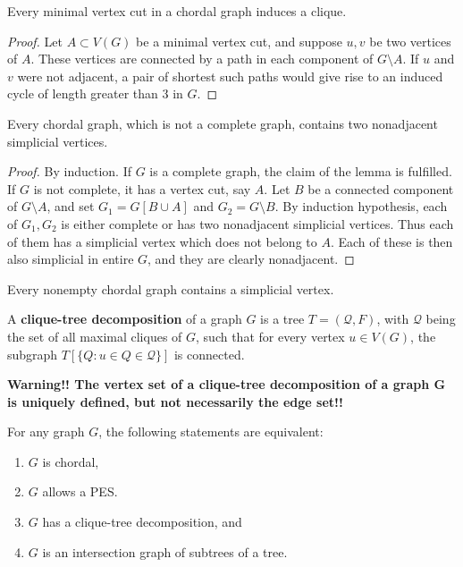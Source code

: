 \begin{lemma}
	Every minimal vertex cut in a chordal graph induces a clique.
\end{lemma}

\begin{proof}
	Let $A \subset V(G)$ be a minimal vertex cut, and suppose $u, v$ be two vertices of $A$. These vertices	are connected by a path in each component of $G \setminus A$. If $u$ and $v$ were not adjacent, a pair of shortest such paths would give rise to an induced cycle of length greater than 3 in $G$.
\end{proof}

\begin{lemma}
	Every chordal graph, which is not a complete graph, contains two nonadjacent simplicial vertices.
	\label{lemma-r2}
\end{lemma}

\begin{proof}
	By induction. If $G$ is a complete graph, the claim of the lemma is fulfilled. If $G$ is not complete, it has a vertex cut, say $A$. Let $B$ be a connected component of $G \setminus A$, and set $G_1 = G[B \cup A]$ and $G_2 = G \setminus B$. By induction hypothesis, each of $G_1, G_2$ is either complete or has two nonadjacent simplicial vertices. Thus each of them has a simplicial vertex which does not belong to $A$. Each of	these is then also simplicial in entire $G$, and they are clearly nonadjacent.
\end{proof}

\begin{cor}
	Every nonempty chordal graph contains a simplicial vertex.
\end{cor}

\begin{defn}
	A \textbf{clique-tree decomposition} of a graph $G$ is a tree $T = (\mathcal{Q}, F)$, with $\mathcal{Q}$ being the set of all maximal cliques of $G$, such that for every vertex $u \in V(G)$, the subgraph $T[\{Q : u \in Q \in \mathcal{Q}\}]$ is connected.
\end{defn}

\textbf{Warning!! The vertex set of a clique-tree decomposition of a graph G is uniquely defined, but not necessarily the edge set!!}

\begin{thm}
	For any graph $G$, the following statements are equivalent:
	
	\begin{enumerate}
		\item $G$ is chordal,
		\item $G$ allows a PES.
		\item $G$ has a clique-tree decomposition, and
		\item $G$ is an intersection graph of subtrees of a tree.
	\end{enumerate}
\end{thm}


